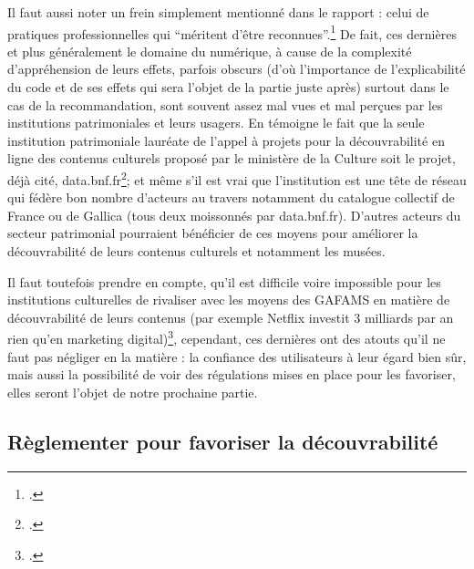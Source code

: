 Il faut aussi noter un frein simplement mentionné dans le rapport : celui de pratiques professionnelles qui \enquote{méritent d’être reconnues}.\footcite[p. 21]{ministeresdelaculturefranceetquebec2020} De fait, ces dernières et plus généralement le domaine du numérique, à cause de la complexité d’appréhension de leurs effets, parfois obscurs (d’où l’importance de l’explicabilité du code et de ses effets qui sera l’objet de la partie juste après) surtout dans le cas de la recommandation, sont souvent assez mal vues et mal perçues par les institutions patrimoniales et leurs usagers. En témoigne le fait que la seule institution patrimoniale lauréate de l’appel à projets pour la découvrabilité en ligne des contenus culturels proposé par le ministère de la Culture soit le projet, déjà cité, data.bnf.fr\footcite{noauthor_decouvrabilite_2024}; et même s’il est vrai que l’institution est une tête de réseau qui fédère bon nombre d’acteurs au travers notamment du catalogue collectif de France ou de Gallica (tous deux moissonnés par data.bnf.fr). D’autres acteurs du secteur patrimonial pourraient bénéficier de ces moyens pour améliorer la découvrabilité de leurs contenus culturels et notamment les musées.  

Il faut toutefois prendre en compte, qu’il est difficile voire impossible pour les institutions culturelles de rivaliser avec les moyens des GAFAMS en matière de découvrabilité de leurs contenus (par exemple Netflix investit 3 milliards par an rien qu’en marketing digital)\footcite[p. 23]{ministeresdelaculturefranceetquebec2020}, cependant, ces dernières ont des atouts qu’il ne faut pas négliger en la matière : la confiance des utilisateurs à leur égard bien sûr, mais aussi la possibilité de voir des régulations mises en place pour les favoriser, elles seront l’objet de notre prochaine partie.


\subsection{Règlementer pour favoriser la découvrabilité}

